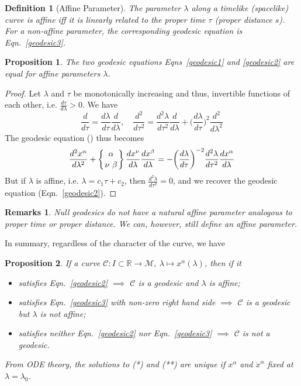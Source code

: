 \documentclass[a4paper]{article}
\newtheorem{remarks}{Remarks}[section]
\theoremstyle{new}
\newtheorem{defi}{Definition}[section]
\newtheorem{prop}{Proposition}[section]
\begin{document}
\begin{defi}[Affine Parameter]
The parameter $\lambda$ along a timelike (spacelike) curve is affine iff it is linearly related to the proper time $\tau$ (proper distance $s$). For a non-affine parameter, the corresponding geodesic equation is Eqn.~\ref{geodesic3}.
\end{defi}
\begin{prop}
The two geodesic equations Eqns~\ref{geodesic1} and \ref{geodesic2} are equal for affine parameters $\lambda$.
\end{prop}
\begin{proof}
Let $\lambda$ and $\tau$ be monotonically increasing and thus, invertible functions of each other, i.e. $\frac{d\tau}{d\lambda}>0$. We have
$$\frac{d}{d\tau}=\frac{d\lambda}{d\tau}\frac{d}{d\lambda},\quad\frac{d^2}{d\tau^2}=\frac{d^2\lambda}{d\tau^2}\frac{d}{d\lambda}+\bigg(\frac{d\lambda}{d\tau}\bigg)^2\frac{d^2}{d\lambda^2}$$
The geodesic equation (\dag) thus becomes
\begin{equation}
\frac{d^2x^\alpha}{d\lambda^2}+\left \{ {\alpha \atop
\nu\ \beta}\right\}\frac{dx^\nu}{d\lambda}\frac{dx^\beta}{d\lambda}=-\bigg(\frac{d\lambda}{d\tau}\bigg)^{-2}\frac{d^2\lambda}{d\tau^2}\frac{dx^\alpha}{d\lambda}\label{geodesic3}
\end{equation}
But if $\lambda$ is affine, i.e. $\lambda=c_1\tau+c_2$, then $\frac{d^2\lambda}{d\tau^2}=0$, and we recover the geodesic equation (Eqn.~\ref{geodesic2}).
\end{proof}
\begin{remarks}
Null geodesics do not have a natural affine parameter analogous to proper time or proper distance. We can, however, still define an affine parameter.
\end{remarks}
In summary, regardless of the character of the curve, we have
\begin{prop}
If a curve $\mathcal{C}:I\subset\mathbb{R}\rightarrow\mathcal{M},~\lambda\mapsto x^\alpha(\lambda)$, then if it
\begin{itemize}
    \item satisfies Eqn.~\ref{geodesic2} $\implies$ $\mathcal{C}$ is a geodesic and $\lambda$ is affine;
    \item satisfies Eqn.~\ref{geodesic3} with non-zero right hand side $\implies$ $\mathcal{C}$ is a geodesic but $\lambda$ is not affine;
    \item satisfies neither Eqn.~\ref{geodesic2} nor Eqn.~\ref{geodesic3} $\implies$ $\mathcal{C}$ is not a geodesic.
\end{itemize}
From ODE theory, the solutions to (*) and (**) are unique if $x^\alpha$ and $\dot{x}^\alpha$ fixed at $\lambda=\lambda_0$.
\end{prop}
\end{document}
